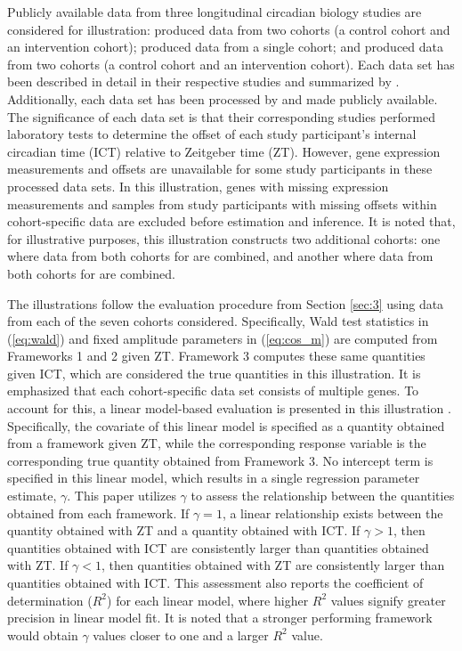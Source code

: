 Publicly available data from three longitudinal circadian biology studies are considered for illustration: \cite{Archer2014} produced data from two cohorts (a control cohort and an intervention cohort); \cite{Braun2018} produced data from a single cohort; and \cite{MllerLevet2013} produced data from two cohorts (a control cohort and an intervention cohort). Each data set has been described in detail in their respective studies and summarized by \cite{Gorczyca2024}. Additionally, each data set has been processed by \cite{Huang2024} and made publicly available. The significance of each data set is that their corresponding studies performed laboratory tests to determine the offset of each study participant's internal circadian time (ICT) relative to Zeitgeber time (ZT). However, gene expression measurements and offsets are unavailable for some study participants in these processed data sets. In this illustration, genes with missing expression measurements and samples from study participants with missing offsets within cohort-specific data are excluded before estimation and inference. It is noted that, for illustrative purposes, this illustration constructs two additional cohorts: one where data from both cohorts for \cite{Archer2014} are combined, and another where data from both cohorts for \cite{MllerLevet2013} are combined.

The illustrations follow the evaluation procedure from Section \ref{sec:3} using data from each of the seven cohorts considered. Specifically, Wald test statistics in (\ref{eq:wald}) and fixed amplitude parameters in (\ref{eq:cos_m}) are computed from Frameworks 1 and 2 given ZT. Framework 3 computes these same quantities given ICT, which are considered the true quantities in this illustration. It is emphasized that each cohort-specific data set consists of multiple genes. To account for this, a linear model-based evaluation is presented in this illustration \citep{Gorczyca2024}. Specifically, the covariate of this linear model is specified as a quantity obtained from a framework given ZT, while the corresponding response variable is the corresponding true quantity obtained from Framework 3. No intercept term is specified in this linear model, which results in a single regression parameter estimate, $\gamma$. This paper utilizes $\gamma$ to assess the relationship between the quantities obtained from each framework. If $\gamma=1$, a linear relationship exists between the quantity obtained with ZT and a quantity obtained with ICT. If $\gamma > 1$, then quantities obtained with ICT are consistently larger than quantities obtained with ZT. If $\gamma < 1$, then quantities obtained with ZT are consistently larger than quantities obtained with ICT. This assessment also reports the coefficient of determination ($R^2$) for each linear model, where higher $R^2$ values signify greater precision in linear model fit. It is noted that a stronger performing framework would obtain $\gamma$ values closer to one and a larger $R^2$ value.

